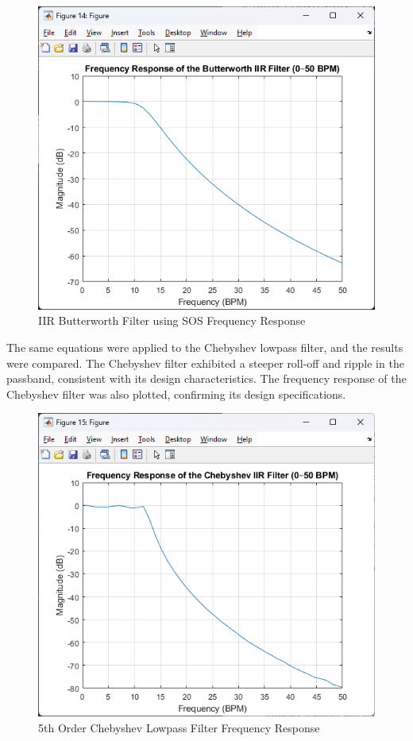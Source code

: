 \documentclass[journal]{IEEEtran}
\begin{document}
\begin{figure}[H]
    \centering
    \includegraphics[width=\linewidth]{5thOrderButtwerworthFrequency.png}
    \caption{IIR Butterworth Filter using SOS Frequency Response}
    \label{fig:band_pass_sos_freq}
\end{figure}

The same equations were applied to the Chebyshev lowpass filter, and the results were compared. The Chebyshev filter exhibited a steeper roll-off and ripple in the passband, consistent with its design characteristics.
The frequency response of the Chebyshev filter was also plotted, confirming its design specifications.

\begin{figure}[H]
    \centering
    \includegraphics[width=\linewidth]{5thOrderChebyFrequency.png}
    \caption{5th Order Chebyshev Lowpass Filter Frequency Response}
    \label{fig:cheby_low_freq}
\end{figure}
\end{document}
